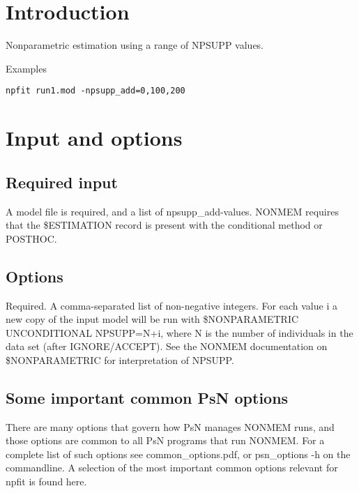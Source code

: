 

\newcommand{\guidetoolname}{npfit}



\maketitle


\section{Introduction}
Nonparametric estimation using a range of NPSUPP values.

Examples
\begin{verbatim}
npfit run1.mod -npsupp_add=0,100,200
\end{verbatim}

\section{Input and options}

\subsection{Required input}
A model file is required, and a list of npsupp\_add-values.
NONMEM requires that the \$ESTIMATION record is present with the conditional method or POSTHOC.

\subsection{Options}
\begin{optionlist}
Required. A comma-separated list of non-negative integers.
For each value i a new copy of the input model will be run with
\$NONPARAMETRIC UNCONDITIONAL NPSUPP=N+i, where N is
the number of individuals in the data set (after IGNORE/ACCEPT).
See the NONMEM documentation on \$NONPARAMETRIC for interpretation of NPSUPP.
\nextopt
\end{optionlist}

\subsection{Some important common PsN options}
There are many options that govern how PsN manages NONMEM runs, and
those options are common to all PsN programs that run NONMEM.
For a complete list of such options see common\_options.pdf, 
or psn\_options -h on the commandline. A selection of
the most important common options relevant for npfit is found here.


